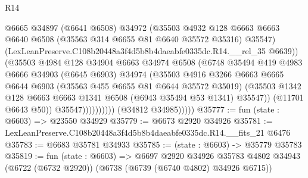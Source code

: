 \begin{lexlean}{R14}
\begin{coremodule}
                                @6665
                                @34897
                                (@6641 @6508)
                                @34972
                                (@35503
                                  @4932
                                  @128
                                  @6663
                                  @6663
                                  @6640
                                  @6508
                                  (@35563 @314 @6655 @81 @6640 @35572 @35316)
                                  @35547)
                                (LexLeanPreserve.C108b20448a3f4d5b8b4daeabfe0335dc.R14.__rel_35
                                  @6639))
                              (@35503
                                @4984
                                @128
                                @34904
                                @6663
                                @34974
                                @6508
                                (@6748
                                  @35494
                                  @419
                                  @4983
                                  @6666
                                  @34903
                                  (@6645 @6903)
                                  @34974
                                  (@35503
                                    @4916
                                    @3266
                                    @6663
                                    @6665
                                    @6644
                                    @6903
                                    (@35563 @455 @6655 @81 @6644 @35572 @35019)
                                    (@35503
                                      @1342
                                      @128
                                      @6663
                                      @6663
                                      @1341
                                      @6508
                                      (@6943 @35494 @53 @1341)
                                      @35547))
                                  (@11701 @6643 @50))
                                @35547))))))))))
            (@34812 @34985)))))
@35777 := fun (state : @6603) => @23550 @34929
@35779 := @6673 @2920 @34926
@35781 := LexLeanPreserve.C108b20448a3f4d5b8b4daeabfe0335dc.R14.__fits_21 @6476
@35783 := @6683 @35781 @34933
@35785 := (state : @6603) -> @35779 @35783
@35819 := fun (state : @6603) =>
  @6697
    @2920
    @34926
    @35783
    @4802
    @34943
    (@6722 (@6732 @2920))
    (@6738 (@6739 (@6740 @4802) @34926 @6715))

\end{coremodule}
\end{lexlean}
